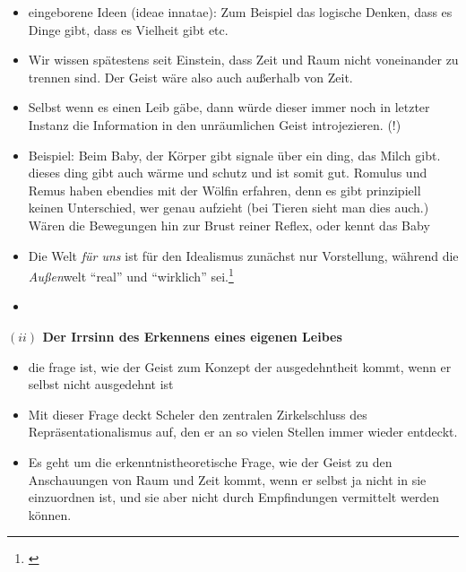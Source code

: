 \documentclass[a4paper, 12pt]{article}
\begin{document}
\begin{onehalfspace}

\begin{itemize}
  \item eingeborene Ideen (ideae innatae): Zum Beispiel das logische Denken, dass es Dinge gibt, dass es Vielheit gibt etc.
  \item Wir wissen spätestens seit Einstein, dass Zeit und Raum nicht voneinander zu trennen sind. Der Geist wäre also auch außerhalb von Zeit. 
  \item Selbst wenn es einen Leib gäbe, dann würde dieser immer noch in letzter Instanz die Information in den unräumlichen Geist introjezieren. (!)
  \item Beispiel: Beim Baby, der Körper gibt signale über ein ding, das Milch gibt. dieses ding gibt auch wärme und schutz und ist somit gut. Romulus und Remus haben ebendies mit der Wölfin erfahren, denn es gibt prinzipiell keinen Unterschied, wer genau aufzieht (bei Tieren sieht man dies auch.) Wären die Bewegungen hin zur Brust reiner Reflex, oder kennt das Baby 
  \item Die Welt \emph{für uns} ist für den Idealismus zunächst nur Vorstellung, während die \emph{Außen}welt "`real"' und "`wirklich"' sei.\footnote{\Cite[Vgl.][S. 257]{scheler-idole}}
\end{itemize}


\begin{itemize}
  \item 
\end{itemize}


\vspace{5mm}
\noindent\textbf{$(ii)$ Der Irrsinn des Erkennens eines eigenen Leibes}



\begin{itemize}
  \item die frage ist, wie der Geist zum Konzept der ausgedehntheit kommt, wenn er selbst nicht ausgedehnt ist
  \item Mit dieser Frage deckt Scheler den zentralen Zirkelschluss des Repräsentationalismus auf, den er an so vielen Stellen immer wieder entdeckt.
  \item Es geht um die erkenntnistheoretische Frage, wie der Geist zu den Anschauungen von Raum und Zeit kommt, wenn er selbst ja nicht in sie einzuordnen ist, und sie aber nicht durch Empfindungen vermittelt werden können.
\end{itemize}




\end{onehalfspace}
\end{document}
